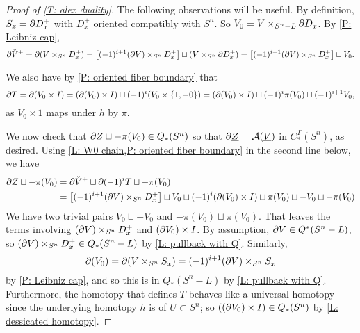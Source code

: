 \begin{example}
\begin{proof}[Proof of \cref{T: alex duality}]
The following observations will be useful.
By definition, $S_x = \partial D_x^+$ with $D_x^+$ oriented compatibly with $S^n$.
So $V_0 = V \times_{S^n-L} \partial D_x$.
By \cref{P: Leibniz cap}, $$\partial \check V^+ = \partial(V \times_{S^n} D_x^+) = \left[(-1)^{i+1} (\partial V) \times_{S^n} D_x^+\right] \sqcup (V \times_{S^n} \partial D_x^+) = \left[(-1)^{i+1} (\partial V) \times_{S^n} D_x^+\right] \sqcup V_0.$$
\begin{comment}Similarly,  $$\bd \check V^+ = \bd(V \times_{S^n} M_x) = \left[(-1)^{i+1} (\bd V) \times_{S^n} D_x\right] \sqcup (V \times_{S^n} \bd M_x)=(-1)^{i+1} ((\bd V)^+)^\vee \sqcup -V_0.$$
\end{comment}
We also have by \cref{P: oriented fiber boundary} that
$$\partial T = \partial (V_0 \times I) = (\partial (V_0) \times I) \sqcup (-1)^{i} (V_0 \times \{1,-0\}) =  (\partial (V_0) \times I) \sqcup (-1)^i\pi(V_0)\sqcup (-1)^{i+1} V_0,$$
as $V_0 \times 1$ maps under $h$ by $\pi$.

\begin{comment}
DO I NEED THIS:::
So, $V_0 = V \times_{S^n} \bd D_x$ represents the same chain as $$\bd(V \times_{S^n} D_x) \sqcup (-1)^{i+1} (\bd V) \times_{S^n} D_x = \bd \check  V^- \sqcup (-1)^{i+1} (\bd V) \times_{S^n} D_x.$$
In particular, the orientation of $V_0$ is the same as the orientation of $\bd \check  V^-$.
\end{comment}



We now check that $\partial Z \sqcup -\pi(V_0) \in Q_*(S^n)$ so that $\partial \underline{Z} = \mathcal{A}(\underline{V})$ in $C_*^\Gamma(S^n)$, as desired.
Using \cref{L: W0 chain,P: oriented fiber boundary} in the second line below, we have
\begin{align*}
\partial Z \sqcup -\pi(V_0) & = \partial \check V^+ \sqcup \partial (-1)^i T \sqcup  -\pi(V_0)\\
&=\left[(-1)^{i+1} (\partial V) \times_{S^n} D_x^+\right] \sqcup V_0 \sqcup
(-1)^i(\partial (V_0) \times I) \sqcup \pi(V_0)\sqcup -V_0
\sqcup  -\pi(V_0)
\end{align*}
We have two trivial pairs $V_0 \sqcup - V_0$ and $ -\pi(V_0) \sqcup \pi(V_0)$.
That leaves the terms involving $(\partial V) \times_{S^n} D_x^+$ and $(\partial V_0) \times I$.
By assumption, $\partial V \in Q^*(S^n-L)$, so $(\partial V) \times_{S^n} D_x^+ \in Q_*(S^n-L)$ by \cref{L: pullback with Q}.
Similarly, $$\partial (V_0) = \partial (V \times_{S^n} S_x) = (-1)^{i+1}(\partial V) \times_{S^n} S_x$$ by \cref{P: Leibniz cap}, and so this is in $Q_*(S^n-L)$ by \cref{L: pullback with Q}.
Furthermore, the homotopy that defines $T$ behaves like a universal homotopy since the underlying homotopy $h$ is of $U \subset S^n$; so $((\partial V_0) \times I) \in Q_*(S^n)$ by \cref{L: dessicated homotopy}.



\end{proof}
\end{example}
